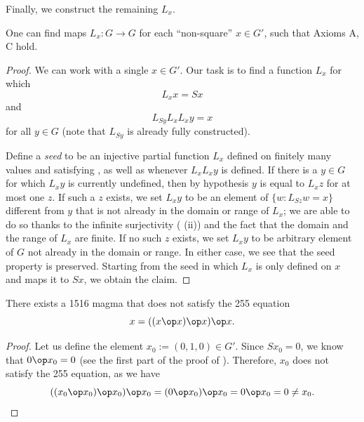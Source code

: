 Finally, we construct the remaining $L_x$.

\begin{proposition}\label{axiom-c} One can find maps $L_x: G \to G$ for each ``non-square'' $x \in G'$, such that Axioms A, C hold.
\end{proposition}

\begin{proof}  We can work with a single $x \in G'$.  Our task is to find a function $L_x$ for which
\begin{equation}\label{axioma-again}
   L_x x = Sx
\end{equation}
and
\begin{equation}\label{axiomb-again}
  L_{Sy} L_x L_x y = x
\end{equation}
for all $y \in G$ (note that $L_{Sy}$ is already fully constructed).

Define a \emph{seed} to be an injective partial function $L_x$ defined on finitely many values and satisfying , as well as  whenever $L_x L_x y$ is defined.
If there is a $y \in G$ for which $L_x y$ is currently undefined, then by hypothesis $y$ is equal to $L_x z$ for at most one $z$.
If such a $z$ exists, we set $L_x y$ to be an element of $\{ w: L_{Sz} w = x \}$ different from $y$ that is not already in the domain or range of $L_x$; we are able to do so thanks to the infinite surjectivity ( (ii)) and the fact that the domain and the range of $L_x$ are finite.
If no such $z$ exists, we set $L_x y$ to be arbitrary element of $G$ not already in the domain or range.  In either case, we see that the seed property is preserved.  Starting from the seed in which $L_x$ is only defined on $x$ and maps it to $Sx$, we obtain the claim.
\end{proof}

\begin{corollary}\label{1516-no-255}  There exists a 1516 magma that does not satisfy the 255 equation $$x = ((x \op x) \op x) \op x.$$
\end{corollary}

\begin{proof}
  Let us define the element $x_0 := (0, 1, 0) \in G'$.
  Since $S x_0 = 0$, we know that $0 \op x_0 = 0$ (see the first part of the proof of ).
  Therefore, $x_0$ does not satisfy the 255 equation, as we have
  $$((x_0 \op x_0) \op x_0) \op x_0 = (0 \op x_0) \op x_0 = 0 \op x_0 = 0 \neq x_0.$$
\end{proof}


